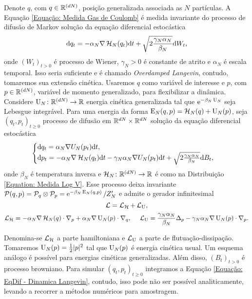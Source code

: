 Denote $q$, com $q \in \mathbb{R}^{(dN)}$, posição generalizada associada as $N$ partículas. A Equação \eqref{Equação: Medida Gas de Coulomb} é medida invariante do processo de difusão de Markov solução da equação diferencial estocástica
\begin{equation}
	\dd q_t = -\alpha_N \nabla \operatorname{\mathcal{H}}_N(q_t) \dd t + \sqrt{2\frac{\gamma_N \alpha_N}{\beta_N}} \dd W_t,
	\label{Equação: Langevin Overdamped}
\end{equation}
onde $(W_t)_{t>0}$ é processo de Wiener, $\gamma_N > 0$ é constante de atrito e $\alpha_N$ é escala temporal. Isso seria suficiente e é chamado \textit{Overdamped Langevin}, contudo, tomaremos sua extensão cinética. Usaremos $q$ como variável de interesse e $p$, com $p \in \mathbb{R}^{(dN)}$, variável de momento generalizado, para flexibilizar a dinâmica. Considere $\operatorname{U}_N \colon \mathbb{R}^{(dN)} \rightarrow \mathbb{R}$ energia cinética generalizada tal que $\operatorname{e}^{-\beta_N \operatorname{U}_N}$ seja Lebesgue integrável. Para uma energia da forma $\operatorname{E}_N(q,p) = \operatorname{\mathcal{H}}_N(q) + \operatorname{U}_N(p)$, seja $(q_t, p_t)_{t\geq0}$ processo de difusão em $\mathbb{R}^{dN} \times \mathbb{R}^{dN}$ solução da equação diferencial estocástica
\begin{equation}
\begin{cases}
	\dd q_t = \alpha_N \nabla U_N (p_t) \dd t, \\
	\dd p_t = -\alpha_N \nabla \operatorname{\mathcal{H}}_N(q_t) \dd t - \gamma_N \alpha_N \nabla U_N(p_t) \dd t + \sqrt{2\frac{\gamma_N \alpha_N}{\beta_N}} \dd B_t,
\end{cases}
\label{Equação: EqDif - Dinamica Langevin}
\end{equation}
onde $\beta_N$ é temperatura inversa e $\operatorname{\mathcal{H}}_N \colon \mathbb{R}^{(dN)} \rightarrow \mathbb{R}$ é como na Distribuição \eqref{Equation: Medida Log V}. \cite{Stoltz2018} Esse processo deixa invariante $\mathcal{P}(q,p) = \mathcal{P}_q \otimes \mathcal{P}_p = \operatorname{e}^{-\beta_N \operatorname{E}_N(q,p)}/Z'_N$ e admite o gerador infinitesimal 
\[
	\operatorname{\mathcal{L}} = \operatorname{\mathcal{L}}_{\operatorname{\mathcal{H}}} + \operatorname{\mathcal{L}}_{\operatorname{U}},
\]
\[
 \operatorname{\mathcal{L}}_{\operatorname{\mathcal{H}}} = -\alpha_N \nabla\operatorname{\mathcal{H}}_N(q) \cdot \nabla_p + \alpha_N \nabla \operatorname{U}_N(p) \cdot \nabla_q, \ \ \ \ \operatorname{\mathcal{L}}_{\operatorname{U}} = \frac{\gamma_N\alpha_N}{\beta_N} \Delta_p - \gamma_N \alpha_N \nabla \operatorname{U}_N(p) \cdot \nabla_p.
\]

Denomina-se $\operatorname{\mathcal{L}}_{\operatorname{\mathcal{H}}}$ a parte hamiltoniana e $\operatorname{\mathcal{L}}_{\operatorname{U}}$ a parte de flutuação-dissipação. Tomaremos $\operatorname{U}_N(p) = \frac{1}{2} |p|^2$ tal que $\operatorname{U}_N(p)$ é energia cinética usual. Um esquema análogo é possível para energias cinéticas generalizadas. \cite{Stoltz2018} Além disso, $(B_t)_{t>0}$ é processo browniano. Para simular $(q_t,p_t)_{t \geq 0}$ integramos a Equação \eqref{Equação: EqDif - Dinamica Langevin}, contudo, isso pode não ser possível analiticamente, levando a recorrer a métodos numéricos para amostragem.